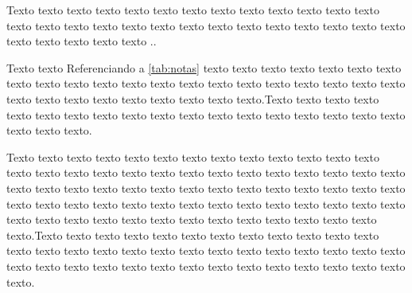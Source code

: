 Texto texto texto texto texto texto texto texto texto texto texto texto texto texto texto texto texto texto texto texto texto texto texto texto texto texto texto texto texto texto texto texto ..

\begin{table}[h!]
	\captionsetup{width=11.3cm}%
\end{table}

Texto texto Referenciando a \autoref{tab:notas}  texto texto texto texto texto texto texto texto texto texto texto texto texto texto texto texto texto texto texto texto texto texto texto texto texto texto texto texto texto texto.Texto texto texto texto texto texto texto texto texto texto texto texto texto texto texto texto texto texto texto texto texto.

Texto texto texto texto texto texto texto texto texto texto texto texto texto texto texto texto texto texto texto texto texto texto texto texto texto texto texto texto texto texto texto texto texto texto texto texto texto texto texto texto texto texto texto texto texto texto texto texto texto texto texto texto texto texto texto texto texto texto texto texto texto texto texto texto texto texto texto texto texto.Texto texto texto texto texto texto texto texto texto texto texto texto texto texto texto texto texto texto texto texto texto texto texto texto texto texto texto texto texto texto texto texto texto texto texto texto texto texto texto texto texto.

